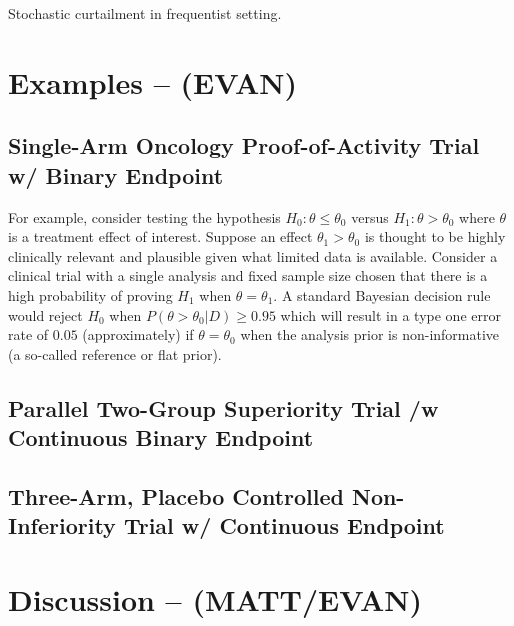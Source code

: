 \documentclass[12pt]{article}
\begin{document}
Stochastic curtailment in frequentist setting.
\section{Examples -- (EVAN)}

\subsection{Single-Arm Oncology Proof-of-Activity Trial w/ Binary Endpoint}
For example, consider testing the hypothesis $H_0:\theta\leq\theta_0$ versus $H_1:\theta>\theta_0$ where $\theta$ is a treatment effect of interest. Suppose an effect $\theta_1>\theta_0$ is thought to be highly clinically relevant and plausible given what limited data is available. Consider a clinical trial with a single analysis and fixed sample size chosen that there is a high probability of proving $H_1$ when $\theta=\theta_1$. A standard Bayesian decision rule would reject $H_0$ when $P(\theta>\theta_0|D)\geq 0.95$ which will result in a type one error rate of $0.05$ (approximately) if $\theta=\theta_0$ when the analysis prior is non-informative (a so-called reference or flat prior).
\subsection{Parallel Two-Group Superiority Trial /w Continuous Binary Endpoint}

\subsection{Three-Arm, Placebo Controlled Non-Inferiority Trial w/ Continuous Endpoint}

\section{Discussion -- (MATT/EVAN)}
\end{document}
